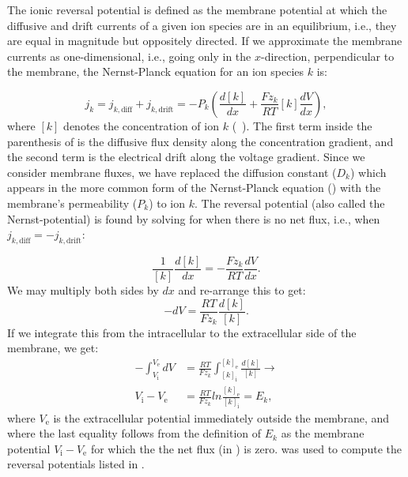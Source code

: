 The ionic reversal potential  is defined as the membrane potential at which the diffusive and drift currents of a given ion species are in an equilibrium, i.e., they are equal in magnitude but oppositely directed. If we approximate the membrane currents as one-dimensional, i.e., going only in the $x$-direction, perpendicular to the membrane, the Nernst-Planck equation for an ion species $k$ is:

\begin{equation}
j_k = j_{k,\text{diff}} + j_{k,\text{drift}} 
=  - P_k \left( \frac{d[k]}{dx} +  \frac{Fz_k}{RT}  [k] \frac{dV}{dx} \right), 
\label{eq:Neuron:NP1D}
\end{equation}
where  $[k]$ denotes the concentration of ion $k$ (\si{\milli\molar}). The first term inside the parenthesis of  is the diffusive flux density along the concentration gradient, and the second term is the electrical drift along the voltage gradient. Since we consider membrane fluxes, we have replaced the diffusion constant ($D_k$) which appears in the more common form of the Nernst-Planck equation () with the membrane's permeability ($P_k$) to ion $k$. The reversal potential (also called the Nernst-potential) is found by solving for when there is no net flux, i.e., when  $j_{k,\text{diff}} = - j_{k,\text{drift}}$:

\begin{equation}
\frac{1}{[k]} \frac{d[k]}{dx} = - \frac{Fz_k}{RT}  \frac{dV}{dx}.
\end{equation}
We may multiply both sides by $dx$ and re-arrange this to get:
\begin{equation}
-dV= \frac{RT}{Fz_k}  \frac{d[k]}{[k]}.
\end{equation}
If we integrate this from the intracellular to the extracellular side of the membrane, we get:
\begin{align}
-\int_{V_{\text{i}}}^{V_{\text{e}}}  dV &= \frac{RT}{Fz_k}  \int_{[k]_{\text{i}}}^{[k]_{\text{e}}} \frac{d[k]}{[k]} \rightarrow \\
V_{\text{i}}-V_{\text{e}} &= \frac{RT}{Fz_k} ln \frac{[k]_{\text{e}}} {[k]_{\text{i}}} = E_k, 
\label{eq:Neuron:revpots}
\end{align}
where $V_{\text{e}}$ is the extracellular potential immediately outside the membrane, and where the last equality follows from the definition of $E_k$ as the membrane potential $V_{\text{i}}-V_{\text{e}}$ for which the the net flux (in ) is zero.  was used to compute the reversal potentials listed in . 

